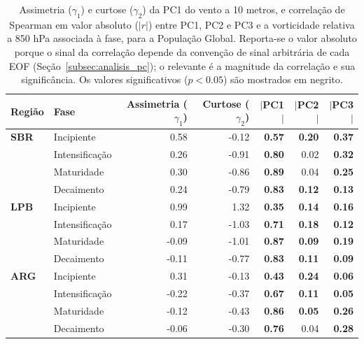 \begin{table}[htbp]
\centering
\caption[Momentos estatísticos e correlação de PC1--PC3 do vento a 10 m - População Global]
{Assimetria ($\gamma_1$) e curtose ($\gamma_2$) da PC1 do vento a 10 metros, e correlação de Spearman em valor absoluto ($|r|$) entre PC1, PC2 e PC3 e a vorticidade relativa a 850 hPa associada à fase, para a População Global. Reporta-se o valor absoluto porque o sinal da correlação depende da convenção de sinal arbitrária de cada EOF (Seção~\ref{subsec:analisis_pc}); o relevante é a magnitude da correlação e sua significância. Os valores significativos ($p<0.05$) são mostrados em negrito.}
\label{tab:stat_global_w10}
\begin{tabular*}{\textwidth}{@{\extracolsep{\fill}}llrrrrr}
\hline
\textbf{Região} & \textbf{Fase} & \textbf{Assimetria ($\gamma_1$)} & \textbf{Curtose ($\gamma_2$)} & \textbf{$|$PC1$|$} & \textbf{$|$PC2$|$} & \textbf{$|$PC3$|$} \\
\hline
\textbf{SBR} & Incipiente       & 0.58  & -0.12 & \textbf{0.57} & \textbf{0.20} & \textbf{0.37} \\
             & Intensificação & 0.26  & -0.91 & \textbf{0.80} & 0.02 & \textbf{0.32} \\
             & Maturidade         & 0.30  & -0.86 & \textbf{0.89} & 0.04 & \textbf{0.25} \\
             & Decaimento     & 0.24  & -0.79 & \textbf{0.83} & \textbf{0.12} & \textbf{0.13} \\
\hline
\textbf{LPB} & Incipiente       & 0.99  & 1.32  & \textbf{0.35} & \textbf{0.14} & \textbf{0.16} \\
             & Intensificação & 0.17  & -1.03 & \textbf{0.71} & \textbf{0.18} & \textbf{0.12} \\
             & Maturidade         & -0.09 & -1.01 & \textbf{0.87} & \textbf{0.09} & \textbf{0.19} \\
             & Decaimento     & -0.11 & -0.77 & \textbf{0.83} & \textbf{0.11} & \textbf{0.09} \\
\hline
\textbf{ARG} & Incipiente       & 0.31  & -0.13 & \textbf{0.43} & \textbf{0.24} & \textbf{0.06} \\
             & Intensificação & -0.22 & -0.37 & \textbf{0.67} & \textbf{0.11} & \textbf{0.05} \\
             & Maturidade         & -0.12 & -0.43 & \textbf{0.86} & \textbf{0.05} & \textbf{0.26} \\
             & Decaimento     & -0.06 & -0.30 & \textbf{0.76} & 0.04 & \textbf{0.28} \\
\hline
\end{tabular*}
\end{table}
